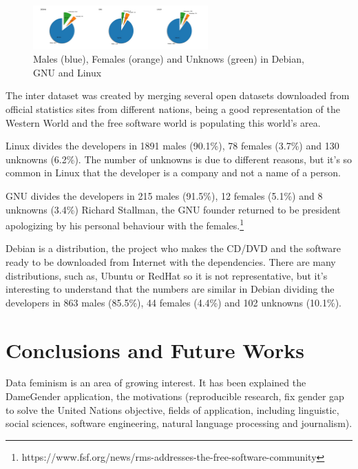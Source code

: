\documentclass[a4paper]{article}
\begin{document}
\begin{figure}
  \centering
  \includegraphics[width=0.6\textwidth]{images/debian_gnu_linux.pdf}
  \caption[Caption for LOF]{Males (blue), Females (orange) and Unknows (green) in Debian, GNU and Linux}
\end{figure}

The inter dataset was created by merging several open datasets
downloaded from official statistics sites from different nations,
being a good representation of the Western World and the free
software world is populating this world's area\cite{gonzalez2008geographic}.

Linux divides the developers in 1891 males (90.1\%), 78 females
(3.7\%) and 130 unknowns (6.2\%). The number of unknowns is due to
different reasons, but it's so common in Linux that the developer is a
company and not a name of a person.

GNU divides the developers in 215 males (91.5\%), 12 females (5.1\%)
and 8 unknowns (3.4\%) Richard Stallman, the GNU founder returned to
be president apologizing by his personal behaviour with the
females.\footnote{https://www.fsf.org/news/rms-addresses-the-free-software-community}

Debian is a distribution, the project who makes the CD/DVD and the
software ready to be downloaded from Internet with the
dependencies. There are many distributions, such as, Ubuntu or RedHat
so it is not representative, but it's interesting to understand that
the numbers are similar in Debian dividing the developers in 863 males
(85.5\%), 44 females (4.4\%) and 102 unknowns (10.1\%).


\section{Conclusions and Future Works}
\label{sec:conclusions}

Data feminism\cite{d2020data} is an area of growing interest.
It has been explained the DameGender application,
the motivations (reproducible research, fix gender gap to solve the
United Nations objective, fields of application, including linguistic,
social sciences, software engineering, natural language processing and
journalism).
\end{document}
